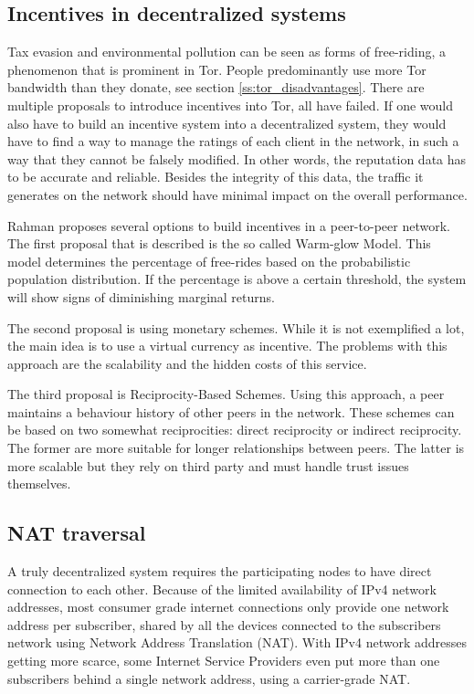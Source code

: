 \documentclass[12pt,journal,compsoc]{IEEEtran}
\begin{document}
	\subsection{Incentives in decentralized systems}
		Tax evasion and environmental pollution can be seen as forms of free-riding, a phenomenon that is prominent in Tor. People predominantly use more Tor bandwidth than they donate, see section \ref{ss:tor_disadvantages}. There are multiple proposals \cite{dingledine2010building, jansen13lira} to introduce incentives into Tor, all have failed. If one would also have to build an incentive system into a decentralized system, they would have to find a way to manage the ratings of each client in the network, in such a way that they cannot be falsely modified. In other words, the reputation data has to be accurate and reliable. Besides the integrity of this data, the traffic it generates on the network should have minimal impact on the overall performance.
		
		Rahman \cite{rahman2009survey} proposes several options to build incentives in a peer-to-peer network. The first proposal that is described is the so called Warm-glow Model. This model determines the percentage of free-rides based on the probabilistic population distribution. If the percentage is above a certain threshold, the system will show signs of diminishing marginal returns.
		
		The second proposal is using monetary schemes. While it is not exemplified a lot, the main idea is to use a virtual currency as incentive. The problems with this approach are the scalability and the hidden costs of this service.
		
		The third proposal is Reciprocity-Based Schemes. Using this approach, a peer maintains a behaviour history of other peers in the network. These schemes can be based on two somewhat reciprocities: direct reciprocity or indirect reciprocity. The former are more suitable for longer relationships between peers. The latter is more scalable but they rely on third party and must handle trust issues themselves.
		
	\subsection{NAT traversal}
		A truly decentralized system requires the participating nodes to have direct connection to each other. Because of the limited availability of IPv4 network addresses, most consumer grade internet connections only provide one network address per subscriber, shared by all the devices connected to the subscribers network using Network Address Translation (NAT). With IPv4 network addresses getting more scarce, some Internet Service Providers even put more than one subscribers behind a single network address, using a carrier-grade NAT.
		
\end{document}
